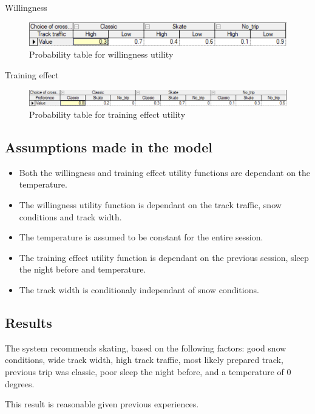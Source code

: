 \documentclass{article}
\begin{document}
\newpage

Willingness

\begin{figure}[h]
    \centering
    \includegraphics[width=\linewidth]{willingness.png}
    \caption{Probability table for willingness utility}
    \label{fig:image5}
\end{figure}

Training effect

\begin{figure}[h]
    \centering
    \includegraphics[width=\linewidth]{training_effect.png}
    \caption{Probability table for training effect utility}
    \label{fig:image6}
\end{figure}

\subsection*{Assumptions made in the model}

\begin{itemize}
    \item Both the willingness and training effect utility functions are dependant on the temperature.
    \item The willingness utility function is dependant on the track traffic, snow conditions and track width.
    \item The temperature is assumed to be constant for the entire session.
    \item The training effect utility function is dependant on the previous session, sleep the night before and temperature.
    \item The track width is conditionaly independant of snow conditions.
\end{itemize}

\subsection*{Results}

The system recommends skating, based on the following factors: good snow conditions, wide track width, high track traffic, most likely prepared track, previous trip was classic, poor sleep the night before, and a temperature of 0 degrees.

\medskip

This result is reasonable given previous experiences.
\end{document}
